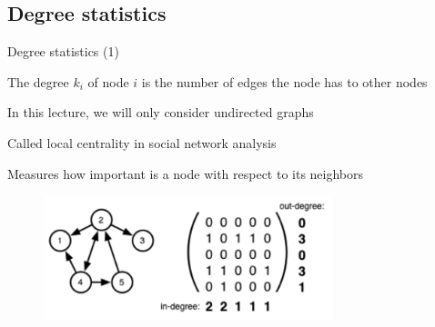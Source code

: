 \subsection{Degree statistics}

\begin{frame}{Degree statistics (1)}

\begin{definition}[Degree]
\BI
\item The \alert{degree} $k_i$ of node $i$ is the number of edges the node has to other nodes
\item In this lecture, we will only consider undirected graphs
\item Called \alert{local centrality} in social network analysis
\item Measures how important is a node with respect to its neighbors
\EI
\end{definition}	

\begin{figure}
	\includegraphics[width=0.75\textwidth]{figs/08/degree}
\end{figure}


\end{frame}

